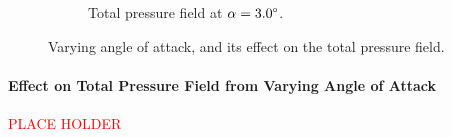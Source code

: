 \begin{figure}[h]
\begin{subfigure}[h]{0.32\linewidth}
        \caption{Total pressure field at $\alpha=3.0\degree$.}
    \end{subfigure}
    \caption[Total Pressure Field with Varying Angle of Attack]{Varying angle of attack, and its effect on the total pressure field.}
\end{figure}

\paragraph{Effect on Total Pressure Field from Varying Angle of Attack}
\textcolor{red}{\large PLACE HOLDER}